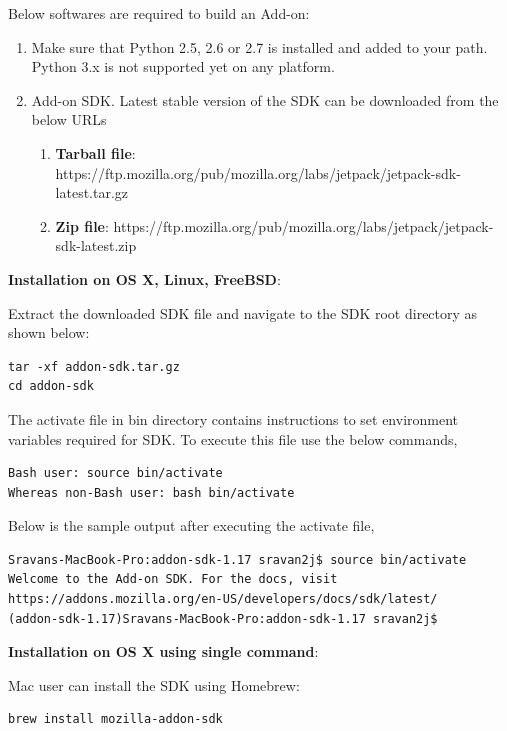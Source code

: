 Below softwares are required to build an Add-on:

\begin{enumerate}
\item Make sure that Python 2.5, 2.6 or 2.7 is installed and added to your path. Python 3.x is not supported yet on any platform. 
\item Add-on SDK. Latest stable version of the SDK can be downloaded from the below URLs
\begin{enumerate}
\item \textbf{Tarball file}: https://ftp.mozilla.org/pub/mozilla.org/labs/jetpack/jetpack-sdk-latest.tar.gz
\item \textbf{Zip file}: https://ftp.mozilla.org/pub/mozilla.org/labs/jetpack/jetpack-sdk-latest.zip
\end{enumerate}
\end{enumerate}

\noindent
\textbf{Installation on OS X, Linux, FreeBSD}:

Extract the downloaded SDK file and navigate to the SDK root directory as shown below:

\begin{lstlisting}[frame=none,numbers=none]
tar -xf addon-sdk.tar.gz
cd addon-sdk
\end{lstlisting}

The activate file in bin directory contains instructions to set environment variables required for SDK. To execute this file use the below commands,
\begin{lstlisting}[frame=none,numbers=none]
Bash user: source bin/activate
Whereas non-Bash user: bash bin/activate
\end{lstlisting}


Below is the sample output after executing the activate file,
\begin{lstlisting}[frame=none,numbers=none,mathescape=false]
Sravans-MacBook-Pro:addon-sdk-1.17 sravan2j$ source bin/activate
Welcome to the Add-on SDK. For the docs, visit https://addons.mozilla.org/en-US/developers/docs/sdk/latest/
(addon-sdk-1.17)Sravans-MacBook-Pro:addon-sdk-1.17 sravan2j$ 
\end{lstlisting}


\noindent
\textbf{Installation on OS X using single command}:

Mac user can install the SDK using Homebrew: 
\begin{lstlisting}[frame=none,numbers=none,mathescape=false]
brew install mozilla-addon-sdk
\end{lstlisting}


